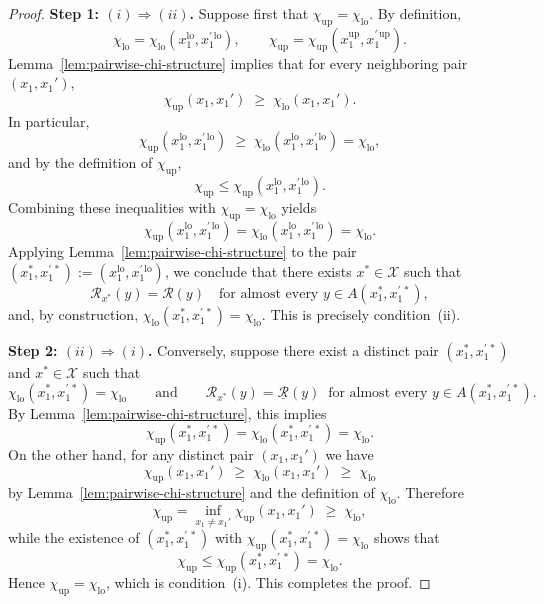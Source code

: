 \documentclass{article}
\theoremstyle{plain}
\theoremstyle{definition}
\begin{document}
\begin{proof}
\textbf{Step 1: $(i)\Rightarrow(ii)$.}
Suppose first that
$\chi_{\mathrm{up}}=\chi_{\mathrm{lo}}$.
By definition,
\[
  \chi_{\mathrm{lo}}
  = \chi_{\mathrm{lo}}(x_1^{\mathrm{lo}},x_1^{\prime\,\mathrm{lo}}),
  \qquad
  \chi_{\mathrm{up}}
  = \chi_{\mathrm{up}}(x_1^{\mathrm{up}},x_1^{\prime\,\mathrm{up}}).
\]
Lemma~\ref{lem:pairwise-chi-structure} implies that for every neighboring
pair $(x_1,x_1')$,
\[
  \chi_{\mathrm{up}}(x_1,x_1')
  \;\ge\;
  \chi_{\mathrm{lo}}(x_1,x_1').
\]
In particular,
\[
  \chi_{\mathrm{up}}(x_1^{\mathrm{lo}},x_1^{\prime\,\mathrm{lo}})
  \;\ge\;
  \chi_{\mathrm{lo}}(x_1^{\mathrm{lo}},x_1^{\prime\,\mathrm{lo}})
  = \chi_{\mathrm{lo}},
\]
and by the definition of $\chi_{\mathrm{up}}$,
\[
  \chi_{\mathrm{up}}
  \le \chi_{\mathrm{up}}(x_1^{\mathrm{lo}},x_1^{\prime\,\mathrm{lo}}).
\]
Combining these inequalities with
$\chi_{\mathrm{up}}=\chi_{\mathrm{lo}}$ yields
\[
  \chi_{\mathrm{up}}(x_1^{\mathrm{lo}},x_1^{\prime\,\mathrm{lo}})
  = \chi_{\mathrm{lo}}(x_1^{\mathrm{lo}},x_1^{\prime\,\mathrm{lo}})
  = \chi_{\mathrm{lo}}.
\]
Applying Lemma~\ref{lem:pairwise-chi-structure} to the pair
$(x_1^\ast,x_1^{\prime\,\ast})
 := (x_1^{\mathrm{lo}},x_1^{\prime\,\mathrm{lo}})$, we conclude that
there exists $x^\ast\in\mathcal X$ such that
\[
  \mathcal R_{x^\ast}(y)
  = {\mathcal R}(y)
  \quad\text{for almost every }y\in A(x_1^\ast,x_1^{\prime\,\ast}),
\]
and, by construction,
$\chi_{\mathrm{lo}}(x_1^\ast,x_1^{\prime\,\ast})=\chi_{\mathrm{lo}}$.
This is precisely condition~\textup{(ii)}.

\textbf{Step 2: $(ii)\Rightarrow(i)$.}
Conversely, suppose there exist a distinct pair
$(x_1^\ast,x_1^{\prime\,\ast})$ and $x^\ast\in\mathcal X$ such that
\[
  \chi_{\mathrm{lo}}(x_1^\ast,x_1^{\prime\,\ast})
  = \chi_{\mathrm{lo}}
  \qquad\text{and}\qquad
  \mathcal R_{x^\ast}(y)
  = \underline{\mathcal R}(y)
  \ \text{ for almost every }y\in A(x_1^\ast,x_1^{\prime\,\ast}).
\]
By Lemma~\ref{lem:pairwise-chi-structure}, this implies
\[
  \chi_{\mathrm{up}}(x_1^\ast,x_1^{\prime\,\ast})
  = \chi_{\mathrm{lo}}(x_1^\ast,x_1^{\prime\,\ast})
  = \chi_{\mathrm{lo}}.
\]
On the other hand, for any distinct pair $(x_1,x_1')$ we have
\[
  \chi_{\mathrm{up}}(x_1,x_1')
  \;\ge\;
  \chi_{\mathrm{lo}}(x_1,x_1')
  \;\ge\;
  \chi_{\mathrm{lo}}
\]
by Lemma~\ref{lem:pairwise-chi-structure} and the definition of
$\chi_{\mathrm{lo}}$.
Therefore
\[
  \chi_{\mathrm{up}}
  = \inf_{x_1\neq x_1'} \chi_{\mathrm{up}}(x_1,x_1')
  \;\ge\;
  \chi_{\mathrm{lo}},
\]
while the existence of $(x_1^\ast,x_1^{\prime\,\ast})$ with
$\chi_{\mathrm{up}}(x_1^\ast,x_1^{\prime\,\ast})=\chi_{\mathrm{lo}}$
shows that
\[
  \chi_{\mathrm{up}}
  \le \chi_{\mathrm{up}}(x_1^\ast,x_1^{\prime\,\ast})
  = \chi_{\mathrm{lo}}.
\]
Hence $\chi_{\mathrm{up}}=\chi_{\mathrm{lo}}$, which
is condition~\textup{(i)}. This completes the proof.



\end{proof}
\end{document}
